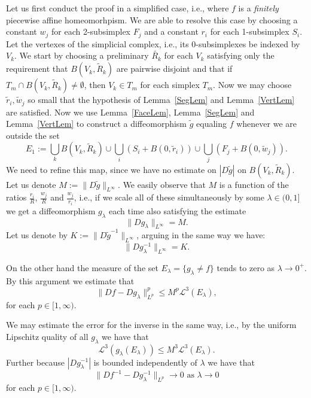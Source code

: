 \documentclass[12pt,a4paper]{amsart}
\theoremstyle{plain}
\theoremstyle{definition}
\numberwithin{equation}{section}
\begin{document}
	Let us first conduct the proof in a simplified case, i.e., where $f$ is a \textit{finitely} piecewise affine homeomorhpism. We are able to resolve this case by choosing a constant $w_j$ for each 2-subsimplex $F_j$ and  a constant $r_i$ for each 1-subsimplex $S_i$. Let the vertexes of the simplicial complex, i.e., its 0-subsimplexes  be indexed by $V_k$. We start by choosing a preliminary $\tilde{R_k}$  for each $V_k$ satisfying only the requirement that $B(V_k, \tilde{R}_k)$ are pairwise disjoint and that if $T_m\cap B(V_k, \tilde{R}_k) \neq \emptyset$, then $V_k\in T_m$ for each simplex $T_m$. Now we may choose $\tilde{r}_i,\tilde{w}_j$ so small that the hypothesis of Lemma~\ref{SegLem} and Lemma~\ref{VertLem} are satisfied. Now we use Lemma~\ref{FaceLem}, Lemma~\ref{SegLem} and Lemma~\ref{VertLem} to construct a diffeomorphism $\tilde{g}$ equaling $f$ whenever we are outside the set
	$$
	E_1:=\bigcup_kB(V_k,\tilde{R}_k) \cup \bigcup_i(S_i + B(0,\tilde{r}_i)) \cup \bigcup_j(F_j + B(0,\tilde{w}_j)).
	$$
	We need to refine this map, since we have no estimate on $|D\tilde{g}|$ on $B(V_k, \tilde{R}_k)$. Let us denote $M:= \|D\tilde{g}\|_{L^\infty}$. We easily observe that $M$ is a function of the ratios $\frac{r_i}{R}$, $\frac{w_j}{R}$ and $\frac{w_j}{r_i}$, i.e., if we scale all of these simultaneously by some $\lambda \in (0,1]$ we get a diffeomorphism $g_{\lambda}$ each time also satisfying the estimate 
	\begin{equation}\label{Napoli}
		\|Dg_{\lambda}\|_{L^{\infty}}= M.
	\end{equation}
	Let us denote by $K:= \|D\tilde{g}^{-1}\|_{L^\infty}$, arguing in the same way we have:
	\begin{equation}\label{Napoli1}
		\|Dg^{-1}_{\lambda}\|_{L^{\infty}}= K.
	\end{equation}
	
	On the other hand the measure of the set $E_{\lambda} = \{g_{\lambda}\neq f\}$ tends to zero as $\lambda \to 0^+$. By this argument we estimate that
	$$
	\|Df-Dg_{\lambda}\|_{L^p}^p\leq M^p\mathcal{L}^3(E_{\lambda}),
	$$
	for each $p\in[1,\infty)$.%
	
	We may estimate the error for the inverse in the same way, i.e., by the uniform Lipschitz quality of all $g_{\lambda}$ we have that 
	$$
	\mathcal{L}^3(g_{\lambda}(E_{\lambda}))\leq M^3\mathcal{L}^3(E_{\lambda}).
	$$
	Further because $|Dg^{-1}_{\lambda}|$ is bounded independently of $\lambda$ we have that 
	$$
	\|Df^{-1}-Dg^{-1}_{\lambda}\|_{L^p} \to 0 \text{ as } \lambda \to 0 
	$$
	for each $p\in[1,\infty)$.
	
\end{document}
